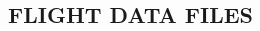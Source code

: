 \documentclass[Space_Shuttle_Ultra_Manual.tex]{subfiles}
\begin{document}
\begin{multicols}{2}
\section{\large FLIGHT DATA FILES}

\end{multicols}
\end{document}
